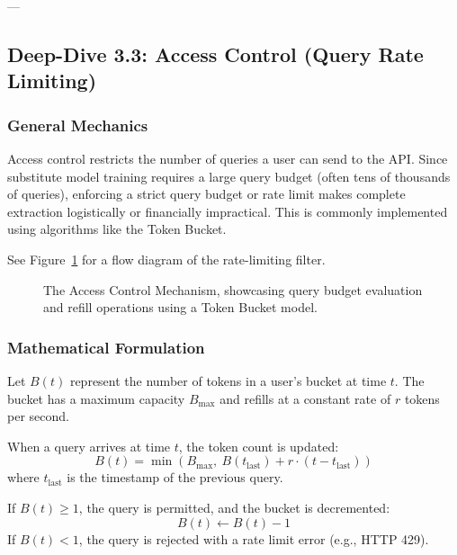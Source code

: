 \documentclass{article}
\begin{document}
---

\subsection{Deep-Dive 3.3: Access Control (Query Rate Limiting)}

\subsubsection{General Mechanics}
Access control restricts the number of queries a user can send to the API. Since substitute model training requires a large query budget (often tens of thousands of queries), enforcing a strict query budget or rate limit makes complete extraction logistically or financially impractical. This is commonly implemented using algorithms like the Token Bucket.

See Figure~\ref{fig:access_control} for a flow diagram of the rate-limiting filter.

\begin{figure}[htbp]
    \centering
    \caption{The Access Control Mechanism, showcasing query budget evaluation and refill operations using a Token Bucket model.}
    \label{fig:access_control}
\end{figure}

\subsubsection{Mathematical Formulation}
Let $B(t)$ represent the number of tokens in a user's bucket at time $t$. The bucket has a maximum capacity $B_{\text{max}}$ and refills at a constant rate of $r$ tokens per second.

When a query arrives at time $t$, the token count is updated:
\begin{equation}
    B(t) = \min\left( B_{\text{max}}, \ B(t_{\text{last}}) + r \cdot (t - t_{\text{last}}) \right)
\end{equation}
where $t_{\text{last}}$ is the timestamp of the previous query. 

If $B(t) \ge 1$, the query is permitted, and the bucket is decremented:
\begin{equation}
    B(t) \leftarrow B(t) - 1
\end{equation}
If $B(t) < 1$, the query is rejected with a rate limit error (e.g., HTTP 429).
\end{document}
